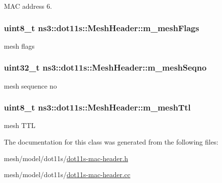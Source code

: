 M\+AC address 6. 

\subsubsection[{\texorpdfstring{m\+\_\+mesh\+Flags}{m_meshFlags}}]{\setlength{\rightskip}{0pt plus 5cm}uint8\+\_\+t ns3\+::dot11s\+::\+Mesh\+Header\+::m\+\_\+mesh\+Flags\hspace{0.3cm}{\ttfamily [private]}}\hypertarget{classns3_1_1dot11s_1_1MeshHeader_a6cb6a7dd16beef2e5cf113df85690cf0}{}\label{classns3_1_1dot11s_1_1MeshHeader_a6cb6a7dd16beef2e5cf113df85690cf0}


mesh flags 

\subsubsection[{\texorpdfstring{m\+\_\+mesh\+Seqno}{m_meshSeqno}}]{\setlength{\rightskip}{0pt plus 5cm}uint32\+\_\+t ns3\+::dot11s\+::\+Mesh\+Header\+::m\+\_\+mesh\+Seqno\hspace{0.3cm}{\ttfamily [private]}}\hypertarget{classns3_1_1dot11s_1_1MeshHeader_af42c8d6c650c246d37c13985641b0776}{}\label{classns3_1_1dot11s_1_1MeshHeader_af42c8d6c650c246d37c13985641b0776}


mesh sequence no 

\subsubsection[{\texorpdfstring{m\+\_\+mesh\+Ttl}{m_meshTtl}}]{\setlength{\rightskip}{0pt plus 5cm}uint8\+\_\+t ns3\+::dot11s\+::\+Mesh\+Header\+::m\+\_\+mesh\+Ttl\hspace{0.3cm}{\ttfamily [private]}}\hypertarget{classns3_1_1dot11s_1_1MeshHeader_ad1e601e495f9e0893c5d2798752b159a}{}\label{classns3_1_1dot11s_1_1MeshHeader_ad1e601e495f9e0893c5d2798752b159a}


mesh T\+TL 



The documentation for this class was generated from the following files\+:\begin{DoxyCompactItemize}
\item 
mesh/model/dot11s/\hyperlink{dot11s-mac-header_8h}{dot11s-\/mac-\/header.\+h}\item 
mesh/model/dot11s/\hyperlink{dot11s-mac-header_8cc}{dot11s-\/mac-\/header.\+cc}\end{DoxyCompactItemize}
